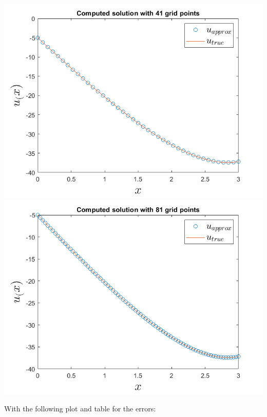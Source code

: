 \documentclass{article}
\begin{document}
\begin{center}
    \includegraphics[scale = 0.4]{bvp4Mod_41.png}
    \includegraphics[scale = 0.4]{bvp4Mod_81.png}
    \newline\newline
    
\end{center}
With the following plot and table for the errors:
\end{document}
